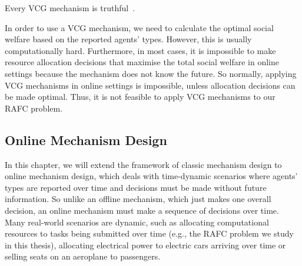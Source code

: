 \documentclass[11pt]{phdthesis}
\begin{document}
\begin{theorem}
	Every VCG mechanism is truthful~\citep[Theorem 9.17]{nisan2007algorithmic}.
\end{theorem}

%
%
%

In order to use a VCG mechanism, we need to calculate the optimal social welfare based on the reported agents' types. However, this is usually computationally hard. Furthermore, in most cases, it is impossible to make resource allocation decisions that maximise the total social welfare in online settings because the mechanism does not know the future. So normally, applying VCG mechanisms in online settings is impossible, unless allocation decisions can be made optimal. Thus, it is not feasible to apply VCG mechanisms to our RAFC problem.

\subsection{Online Mechanism Design} \label{online mechanism design}

In this chapter, we will extend the framework of classic mechanism design to online mechanism design, which deals with time-dynamic scenarios where agents' types are reported over time and decisions must be made without future information. So unlike an offline mechanism, which just makes one overall decision, an online mechanism must make a sequence of decisions over time. 
Many real-world scenarios are dynamic, such as allocating computational resources to tasks being submitted over time (e.g., the RAFC problem we study in this thesis), allocating electrical power to electric cars arriving over time or selling seats on an aeroplane to passengers. 
\end{document}
